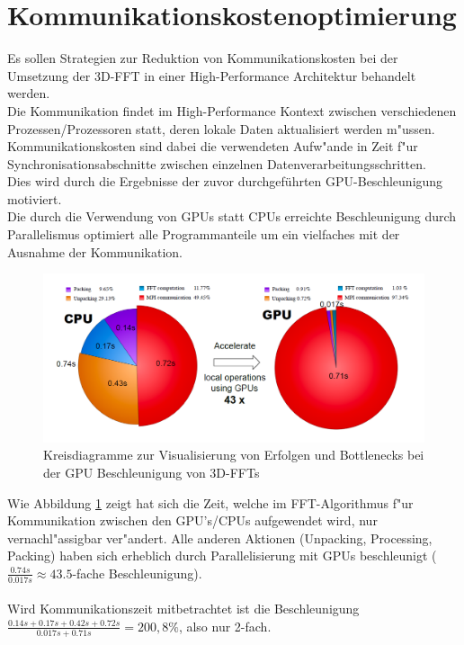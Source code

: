\section{Kommunikationskostenoptimierung}
Es sollen Strategien zur Reduktion von Kommunikationskosten bei der Umsetzung der 3D-FFT in einer High-Performance Architektur behandelt werden.\\

Die Kommunikation findet im High-Performance Kontext zwischen verschiedenen Prozessen/Prozessoren statt, deren lokale Daten aktualisiert werden m"ussen.\\
Kommunikationskosten sind dabei die verwendeten Aufw"ande in Zeit f"ur Synchronisationsabschnitte zwischen einzelnen Datenverarbeitungsschritten.\\
Dies wird durch die Ergebnisse der zuvor durchgeführten GPU-Beschleunigung motiviert.\\
Die durch die Verwendung von GPUs statt CPUs erreichte Beschleunigung durch Parallelismus optimiert alle Programmanteile um ein vielfaches mit der Ausnahme der Kommunikation.\\

\begin{figure}
\centering
  \includegraphics[width=\linewidth]{res/speedup.png}
  \caption{\cite[Abb. 3]{mainpaper} Kreisdiagramme zur Visualisierung von Erfolgen und Bottlenecks bei der GPU Beschleunigung von 3D-FFTs}
  \label{fig:speedup}
\end{figure}

Wie Abbildung \ref{fig:speedup} zeigt hat sich die Zeit, welche im FFT-Algorithmus f"ur Kommunikation zwischen den GPU's/CPUs aufgewendet wird, nur vernachl"assigbar ver"andert. Alle anderen Aktionen (Unpacking, Processing, Packing) haben sich erheblich durch Parallelisierung mit GPUs beschleunigt ($ \frac{0.74s}{0.017s} \approx 43.5$-fache Beschleunigung).\\
\\
Wird Kommunikationszeit mitbetrachtet ist die Beschleunigung $\frac{0.14s+0.17s+0.42s+0.72s}{0.017s+0.71s}=200,8\%$, also nur 2-fach.

